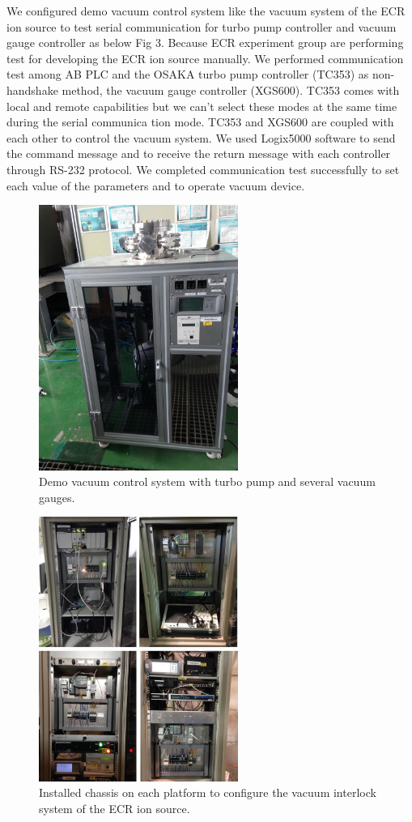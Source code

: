 \documentclass[a4paper,
              ]{jacow}
\begin{document}
We configured demo vacuum control system like the vacuum system of the ECR ion source to test serial communication for turbo pump controller and vacuum gauge controller as below Fig 3. Because ECR experiment group are performing test for developing the ECR ion source manually. 
We performed communication test among AB PLC and the OSAKA turbo pump controller (TC353) as non-handshake method, the vacuum gauge controller (XGS600). TC353 comes with local and remote capabilities but we can’t select these modes at the same time during the serial communica tion mode. TC353 and XGS600 are coupled with each other to control the vacuum system. We used Logix5000 software to send the command message and to receive the return message with each controller through RS-232 protocol. We completed communication test successfully to set each value of the parameters and to operate vacuum device.  

\begin{figure}[!htb]
   \centering
   \includegraphics*[width=65mm]{MOPGF119f3}
   \caption{Demo vacuum control system with turbo pump and several vacuum gauges.}
   \label{l2ea4-f1}
\end{figure}

\begin{figure}[!htb]
	\centering
	\includegraphics*[width=65mm]{MOPGF119f4}
	\caption{Installed chassis on each platform to configure the vacuum interlock system of the ECR ion source.}
	\label{l2ea4-f1}
\end{figure}
\end{document}
